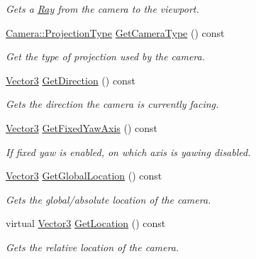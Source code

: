 \begin{DoxyCompactItemize}
\begin{DoxyCompactList}\small\item\em Gets a \hyperlink{classMezzanine_1_1Ray}{Ray} from the camera to the viewport. \item\end{DoxyCompactList}\item 
\hyperlink{classMezzanine_1_1Camera_a643bf90630796bca5353967664d5f6e3}{Camera::ProjectionType} \hyperlink{classMezzanine_1_1Camera_aef2f7b71aedee46bacc1341c02a813a2}{GetCameraType} () const 
\begin{DoxyCompactList}\small\item\em Get the type of projection used by the camera. \item\end{DoxyCompactList}\item 
\hyperlink{classMezzanine_1_1Vector3}{Vector3} \hyperlink{classMezzanine_1_1Camera_a1b23b180e30225bc6e1b90a2d270771e}{GetDirection} () const 
\begin{DoxyCompactList}\small\item\em Gets the direction the camera is currently facing. \item\end{DoxyCompactList}\item 
\hyperlink{classMezzanine_1_1Vector3}{Vector3} \hyperlink{classMezzanine_1_1Camera_af7a94974ef5ff6caff66da3a9f71b579}{GetFixedYawAxis} () const 
\begin{DoxyCompactList}\small\item\em If fixed yaw is enabled, on which axis is yawing disabled. \item\end{DoxyCompactList}\item 
\hyperlink{classMezzanine_1_1Vector3}{Vector3} \hyperlink{classMezzanine_1_1Camera_a94b66663d7c52ec642347d5d939cf67b}{GetGlobalLocation} () const 
\begin{DoxyCompactList}\small\item\em Gets the global/absolute location of the camera. \item\end{DoxyCompactList}\item 
virtual \hyperlink{classMezzanine_1_1Vector3}{Vector3} \hyperlink{classMezzanine_1_1Camera_afb87a19855c4cd5361861e1e400d5481}{GetLocation} () const 
\begin{DoxyCompactList}\small\item\em Gets the relative location of the camera. \item\end{DoxyCompactList}\item 

\end{DoxyCompactItemize}

